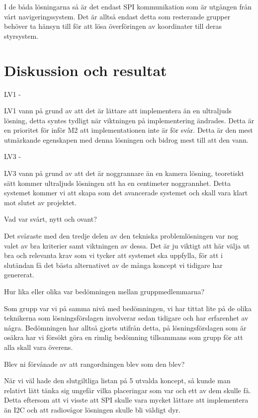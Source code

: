\documentclass[11pt, a4paper]{report}
\begin{document}
I de båda lösningarna så är det endast SPI kommunikation som är utgången från vårt navigeringssystem. Det är alltså endast detta som resterande grupper behöver ta hänsyn till för att lösa överföringen av koordinater till deras styrsystem.

\section{Diskussion och resultat}

LV1 -

LV1 vann på grund av att det är lättare att implementera än en ultraljuds lösning, detta syntes tydligt när viktningen på implementering ändrades. Detta är en prioritet för inför M2 att implementationen inte är för svår. Detta är den mest utmärkande egenskapen med denna lösningen och bidrog mest till att den vann. 

LV3 -

LV3 vann på grund av att det är noggrannare än en kamera lösning, teoretiskt sätt kommer ultraljuds lösningen att ha en centimeter noggrannhet. Detta systemet kommer vi att skapa som det avancerade systemet och skall vara klart mot slutet av projektet.



Vad var svårt, nytt och ovant?

Det svåraste med den tredje delen av den tekniska problemlösningen var nog valet av bra kriterier samt viktningen av dessa. Det är ju viktigt att här välja ut bra och relevanta krav som vi tycker att systemet ska uppfylla, för att i slutändan få det bästa alternativet av de många koncept vi tidigare har genererat.


Hur lika eller olika var bedömningen mellan gruppmedlemmarna?

Som grupp var vi på samma nivå med bedömningen, vi har tittat lite på de olika teknikerna som lösningsförslagen involverar sedan tidigare och har erfarenhet av några. Bedömningen har alltså gjorts utifrån detta, på lösningsförslagen som är osäkra har vi försökt göra en rimlig bedömning tillsammans som grupp för att alla skall vara överens.

Blev ni förvånade av att rangordningen blev som den blev?

När vi väl hade den slutgiltliga listan på 5 utvalda koncept, så kunde man relativt lätt tänka sig ungefär vilka placeringar som var och ett av dem skulle få. Detta eftersom att vi visste att SPI skulle vara mycket lättare att implementera än I2C och att radiovågor lösningen skulle bli väldigt dyr.
\end{document}
